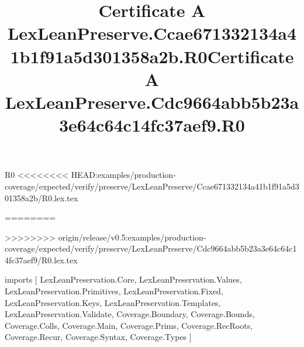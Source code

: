 \begin{lexlean}{R0}
<<<<<<<< HEAD:examples/production-coverage/expected/verify/preserve/LexLeanPreserve/Ccae671332134a41b1f91a5d301358a2b/R0.lex.tex
\title{Certificate A LexLeanPreserve.Ccae671332134a41b1f91a5d301358a2b.R0}
========
\title{Certificate A LexLeanPreserve.Cdc9664abb5b23a3e64c64c14fc37aef9.R0}
>>>>>>>> origin/release/v0.5:examples/production-coverage/expected/verify/preserve/LexLeanPreserve/Cdc9664abb5b23a3e64c64c14fc37aef9/R0.lex.tex
\begin{coremodule}
imports [
  LexLeanPreservation.Core,
  LexLeanPreservation.Values,
  LexLeanPreservation.Primitives,
  LexLeanPreservation.Fixed,
  LexLeanPreservation.Keys,
  LexLeanPreservation.Templates,
  LexLeanPreservation.Validate,
  Coverage.Boundary,
  Coverage.Bounds,
  Coverage.Colls,
  Coverage.Main,
  Coverage.Prims,
  Coverage.RecRoots,
  Coverage.Recur,
  Coverage.Syntax,
  Coverage.Types
]


\end{coremodule}
\end{lexlean}
